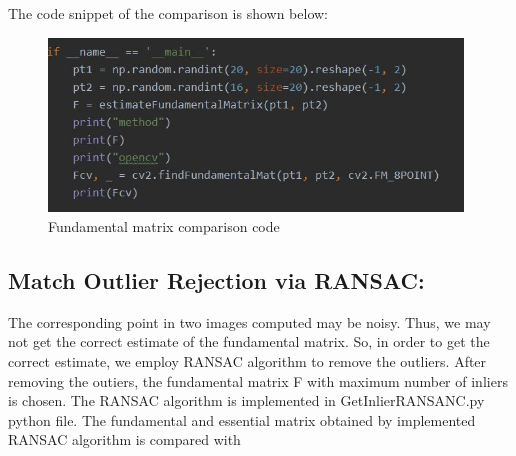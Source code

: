 \documentclass[12pt]{article}
\begin{document}
\newline
The code snippet of the comparison is shown below:
\newpage
\begin{figure}[h]
    \centering
    \includegraphics[width=11cm]{funcode}
    \caption{Fundamental matrix comparison code}
    \label{fig:Fundamental matrix comparison code}
\end{figure}
\subsection{Match Outlier Rejection via RANSAC:}
The corresponding point in two images computed may be noisy. Thus, we may not get the correct estimate of the fundamental matrix. So, in order to get the correct estimate, we employ RANSAC algorithm to remove the outliers. After removing the outiers, the fundamental matrix F with maximum number of inliers is chosen. The RANSAC algorithm is implemented in GetInlierRANSANC.py python file. The fundamental and essential matrix obtained by implemented RANSAC algorithm is compared with 
\end{document}
